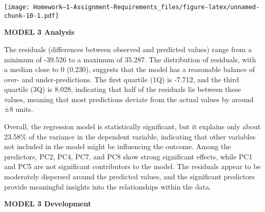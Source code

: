 \documentclass[
]{article}
\newenvironment{Shaded}{\begin{snugshade}}{\end{snugshade}}
\newcommand{\AttributeTok}[1]{\textcolor[rgb]{0.13,0.29,0.53}{#1}}
\newcommand{\CommentTok}[1]{\textcolor[rgb]{0.56,0.35,0.01}{\textit{#1}}}
\newcommand{\ConstantTok}[1]{\textcolor[rgb]{0.56,0.35,0.01}{#1}}
\newcommand{\DecValTok}[1]{\textcolor[rgb]{0.00,0.00,0.81}{#1}}
\newcommand{\FloatTok}[1]{\textcolor[rgb]{0.00,0.00,0.81}{#1}}
\newcommand{\FunctionTok}[1]{\textcolor[rgb]{0.13,0.29,0.53}{\textbf{#1}}}
\newcommand{\NormalTok}[1]{#1}
\newcommand{\OtherTok}[1]{\textcolor[rgb]{0.56,0.35,0.01}{#1}}
\newcommand{\SpecialCharTok}[1]{\textcolor[rgb]{0.81,0.36,0.00}{\textbf{#1}}}
\newcommand{\StringTok}[1]{\textcolor[rgb]{0.31,0.60,0.02}{#1}}
\begin{document}
\texttt{[image: Homework--1-Assignment-Requirements\_files/figure-latex/unnamed-chunk-10-1.pdf]}

\textbf{MODEL 3 Analysis}

The residuals (differences between observed and predicted values) range
from a minimum of -39.526 to a maximum of 35.287. The distribution of
residuals, with a median close to 0 (0.230), suggests that the model has
a reasonable balance of over- and under-predictions. The first quartile
(1Q) is -7.712, and the third quartile (3Q) is 8.028, indicating that
half of the residuals lie between these values, meaning that most
predictions deviate from the actual values by around ±8 units.

Overall, the regression model is statistically significant, but it
explains only about 23.58\% of the variance in the dependent variable,
indicating that other variables not included in the model might be
influencing the outcome. Among the predictors, PC2, PC4, PC7, and PC8
show strong significant effects, while PC1 and PC5 are not significant
contributors to the model. The residuals appear to be moderately
dispersed around the predicted values, and the significant predictors
provide meaningful insights into the relationships within the data.

\textbf{MODEL 3 Development}

\begin{Shaded}
\end{Shaded}
\end{document}
